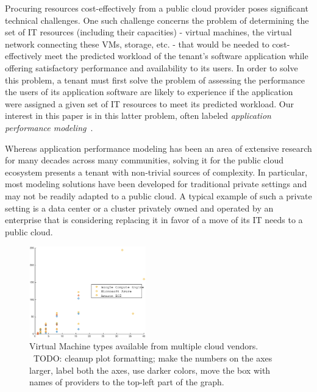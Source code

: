 \documentclass{acm_proc_article-sp}
\newcommand{\bu}[1]{{\color{blue}#1}}
\begin{document}
Procuring resources cost-effectively from a public cloud provider poses significant technical challenges. One such challenge concerns the problem of determining the set of IT resources (including their capacities) - virtual machines, the virtual network connecting these VMs, storage, etc. - that would be needed to cost-effectively meet the predicted workload of the tenant's software application while offering satisfactory performance and availability to its users. In order to solve this problem, a tenant must first solve the problem of assessing the performance the users of its application software are likely to experience if the application were assigned a given set of IT resources to meet its predicted workload. Our interest in this paper is in this latter problem, often labeled {\it application performance modeling}~\cite{sigmetrics05,xxx}. 


Whereas application performance modeling has been an area of extensive research for many decades across many communities, solving it for the public cloud ecosystem presents a tenant with non-trivial sources of complexity. In particular, most modeling solutions have been developed for traditional private settings and may not be readily adapted to a public cloud. A typical example of such a private setting is a data center or a cluster privately owned and operated by an enterprise that is considering replacing it in favor of a move of its IT needs to a public cloud. 

\begin{figure}[htbp]
\centering
\includegraphics[width=0.45\textwidth]{cloud_vm_types.eps}
\caption{Virtual Machine types available from multiple cloud vendors. 
~\bu{TODO: cleanup plot formatting; make the numbers on the axes larger, label both the axes, use darker colors, move the box with names of providers to the top-left part of the graph.}} \label{fig:diversity}
\end{figure}
\end{document}
